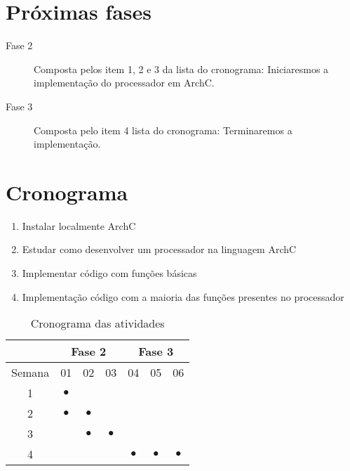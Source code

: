 \documentclass[10pt,a4paper]{article}
\begin{document}
  \section*{Próximas fases}
  
  \begin{description}
  \item[Fase 2] Composta pelos item 1, 2 e 3 da lista do cronograma:
    Iniciaresmos a implementação do processador em ArchC.
  \item[Fase 3] Composta pelo item 4 lista do cronograma: Terminaremos
    a implementação.
 
  \end{description}
  
  \section*{Cronograma}
    
  \begin{enumerate}
  \item Instalar localmente ArchC
  \item Estudar como desenvolver um processador na linguagem ArchC
  \item Implementar código com funções básicas 
  \item Implementação código com a maioria das funções presentes no processador
    
  \end{enumerate}

  \begin{table}[h!]
    \caption{Cronograma das atividades}
    \begin{center} {
        \begin{tabular}{ |c|c|c|c|c|c|c|}
          \hline
          & \multicolumn{3}{|c|}{Fase 2} & \multicolumn{3}{|c|}{Fase 3} 	\\ \hline
          Semana & 01 & 02  & 03 & 04 & 05 & 06 \\ \hline
          1 & $\bullet$ &  & &  & & \\ \hline
          2 & $\bullet$ & $\bullet$ & & &  & \\ \hline
          3 & & $\bullet$ & $\bullet$ & &  & \\ \hline
          4 &  &  &  & $\bullet$ & $\bullet$ & $\bullet$\\ \hline
          

          \hline
        \end{tabular}
      }\end{center}
    \label{tab:cronograma}
  \end{table}

 
 \begin{small}\end{small}
 \label{referencias}
  
\end{document}
